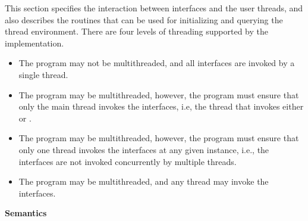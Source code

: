 This section specifies the interaction between \openshmem{} interfaces and the
user threads, and also describes the routines that can be used for initializing and 
querying the thread environment. There are four levels of threading supported by
the \openshmem{} implementation.
 
\begin{itemize}
\item {\bf {}} The \openshmem{} program may not be multithreaded, 
and all \openshmem{} interfaces are invoked by a single thread. 

\item {\bf {}}
The \openshmem{} program may be multithreaded, however, the 
program must ensure that only the main thread invokes the \openshmem{}
interfaces, i.e, the thread that invokes either  or
.

\item {\bf {}} 
The \openshmem{} program may be multithreaded, however, the 
program must ensure that only one thread invokes the \openshmem{}
interfaces at any given instance, i.e., the \openshmem{} interfaces 
are not invoked concurrently by multiple threads.

\item {\bf {}}
The \openshmem{} program may be multithreaded, and any 
thread may invoke the \openshmem{} interfaces.
\end{itemize}

\hspace{-15pt}
{\bf Semantics}


